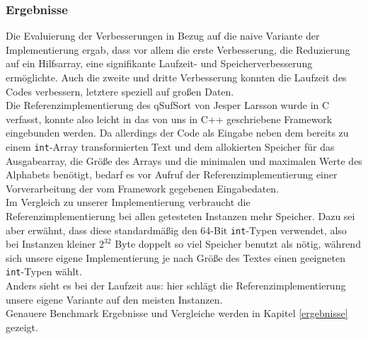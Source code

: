 \subsubsection{Ergebnisse}
Die Evaluierung der Verbesserungen in Bezug auf die naive Variante der Implementierung ergab, dass vor allem die erste Verbesserung, die Reduzierung auf ein Hilfsarray, eine signifikante Laufzeit- und Speicherverbesserung ermöglichte.
Auch die zweite und dritte Verbesserung konnten die Laufzeit des Codes verbessern, letztere speziell auf großen Daten.\\
Die Referenzimplementierung des qSufSort von Jesper Larsson wurde in C verfasst, konnte also leicht in das von uns in C++ geschriebene Framework eingebunden werden. Da allerdings der Code als Eingabe neben dem bereits zu einem \texttt{int}-Array transformierten Text und dem allokierten Speicher für das Ausgabearray, die Größe des Arrays und die minimalen und maximalen Werte des Alphabets benötigt, bedarf es vor Aufruf der Referenzimplementierung einer Vorverarbeitung der vom Framework gegebenen Eingabedaten. \\
Im Vergleich zu unserer Implementierung verbraucht die Referenzimplementierung bei allen getesteten Instanzen mehr Speicher. Dazu sei aber erwähnt, dass diese standardmäßig den 64-Bit \texttt{int}-Typen verwendet, also bei Instanzen kleiner $2^{32}$ Byte doppelt so viel Speicher benutzt als nötig, während sich unsere eigene Implementierung je nach Größe des Textes einen geeigneten \texttt{int}-Typen wählt. \\
Anders sieht es bei der Laufzeit aus: hier schlägt die Referenzimplementierung unsere eigene Variante auf den meisten Instanzen. \\
Genauere Benchmark Ergebnisse und Vergleiche werden in Kapitel \ref{ergebnisse} gezeigt.